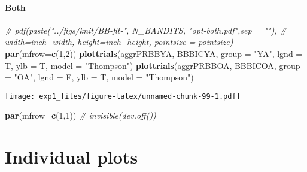 \documentclass[11pt,,]{article}
\newenvironment{Shaded}{\begin{snugshade}}{\end{snugshade}}
\newcommand{\KeywordTok}[1]{\textcolor[rgb]{0.13,0.29,0.53}{\textbf{{#1}}}}
\newcommand{\DataTypeTok}[1]{\textcolor[rgb]{0.13,0.29,0.53}{{#1}}}
\newcommand{\DecValTok}[1]{\textcolor[rgb]{0.00,0.00,0.81}{{#1}}}
\newcommand{\StringTok}[1]{\textcolor[rgb]{0.31,0.60,0.02}{{#1}}}
\newcommand{\CommentTok}[1]{\textcolor[rgb]{0.56,0.35,0.01}{\textit{{#1}}}}
\newcommand{\NormalTok}[1]{{#1}}
\let\oldparagraph\paragraph
\renewcommand{\paragraph}[1]{\oldparagraph{#1}\mbox{}}
\begin{document}
\newpage

\paragraph{Both}\label{both-1}

\begin{Shaded}
\end{Shaded}

\begin{Shaded}
\begin{Highlighting}[]
\CommentTok{# pdf(paste("../figs/knit/BB-fit-",  N_BANDITS, "opt-both.pdf",sep = ""), }
\CommentTok{# width=inch_width, height=inch_height, pointsize = pointsize)}
\KeywordTok{par}\NormalTok{(}\DataTypeTok{mfrow=}\KeywordTok{c}\NormalTok{(}\DecValTok{1}\NormalTok{,}\DecValTok{2}\NormalTok{))}
\KeywordTok{plottrials}\NormalTok{(aggrPRBBYA, BBBICYA, }\DataTypeTok{group =} \StringTok{"YA"}\NormalTok{, }\DataTypeTok{lgnd =} \NormalTok{T, }\DataTypeTok{ylb =} \NormalTok{T, }\DataTypeTok{model =} \StringTok{"Thompson"}\NormalTok{)}
\KeywordTok{plottrials}\NormalTok{(aggrPRBBOA, BBBICOA, }\DataTypeTok{group =} \StringTok{"OA"}\NormalTok{, }\DataTypeTok{lgnd =} \NormalTok{F, }\DataTypeTok{ylb =} \NormalTok{T, }\DataTypeTok{model =} \StringTok{"Thompson"}\NormalTok{)}
\end{Highlighting}
\end{Shaded}

\texttt{[image: exp1\_files/figure-latex/unnamed-chunk-99-1.pdf]}

\begin{Shaded}
\begin{Highlighting}[]
\KeywordTok{par}\NormalTok{(}\DataTypeTok{mfrow=}\KeywordTok{c}\NormalTok{(}\DecValTok{1}\NormalTok{,}\DecValTok{1}\NormalTok{))}
\CommentTok{# invisible(dev.off())}
\end{Highlighting}
\end{Shaded}

\newpage

\newpage

\section{Individual plots}\label{individual-plots}
\end{document}
